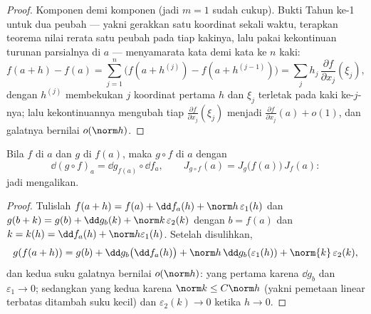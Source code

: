 \begin{proof}
Komponen demi komponen (jadi $m = 1$ sudah cukup). Bukti Tahun ke-1 untuk dua
peubah --- yakni gerakkan satu koordinat sekali waktu, terapkan teorema nilai
rerata satu peubah pada tiap kakinya, lalu pakai kekontinuan turunan parsialnya
di $a$ --- menyamarata kata demi kata ke $n$ kaki:
\[
f(a + h) - f(a) = \sum_{j=1}^{n} \bigl(f(a + h^{(j)}) - f(a +
h^{(j-1)})\bigr)
= \sum_j h_j\,\frac{\partial f}{\partial x_j}(\xi_j),
\]
dengan $h^{(j)}$ membekukan $j$ koordinat pertama $h$ dan
$\xi_j$ terletak pada kaki ke-$j$-nya; lalu kekontinuannya mengubah tiap
$\frac{\partial f}{\partial x_j}(\xi_j)$ menjadi $\frac{\partial
f}{\partial x_j}(a) + o(1)$, dan galatnya bernilai $o(\norm h)$.
\end{proof}

\begin{theorem}\label{thm:b2:diffcalc:chainrule}
Bila $f$  di $a$ dan $g$ di $f(a)$, maka $g \circ f$
 di $a$ dengan
\[
\dd(g \circ f)_a = \dd g_{f(a)} \circ \dd f_a ,
\qquad
J_{g\circ f}(a) = J_g\bigl(f(a)\bigr)\,J_f(a) :
\]
jadi  mengalikan.
\end{theorem}

\begin{proof}
Tulislah $f(a + h) = f(a) + \dd f_a(h) + \norm h\,\varepsilon_1(h)$
dan $g(b + k) = g(b) + \dd g_b(k) + \norm k\,\varepsilon_2(k)$ dengan
$b = f(a)$ dan $k = k(h) = \dd f_a(h) + \norm h \varepsilon_1(h)$.
Setelah disulihkan,
\[
g(f(a+h)) = g(b) + \dd g_b\bigl(\dd f_a(h)\bigr)
+ \norm h\,\dd g_b(\varepsilon_1(h)) + \norm{k}\,\varepsilon_2(k),
\]
dan kedua suku galatnya bernilai $o(\norm h)$: yang pertama karena $\dd g_b$
 dan $\varepsilon_1 \to 0$; sedangkan yang kedua karena $\norm k
\leq C\norm h$ (yakni pemetaan linear terbatas ditambah suku kecil) dan
$\varepsilon_2(k) \to 0$ ketika $h \to 0$.
\end{proof}

